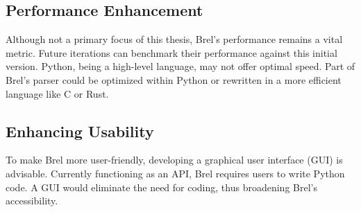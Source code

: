 

\subsection{Performance Enhancement}

Although not a primary focus of this thesis, Brel's performance remains a vital metric.
Future iterations can benchmark their performance against this initial version.
Python, being a high-level language, may not offer optimal speed.
Part of Brel's parser could be 
\textcolor{airforceblue}{optimized within Python or rewritten in a more efficient language} like C or Rust.



\subsection{Enhancing Usability}

To make Brel more user-friendly, 
\textcolor{turkishrose}{developing a graphical user interface} (GUI) is advisable.
Currently functioning as an API, Brel requires users to write Python code.
A GUI would eliminate the need for coding, thus broadening Brel's accessibility.



